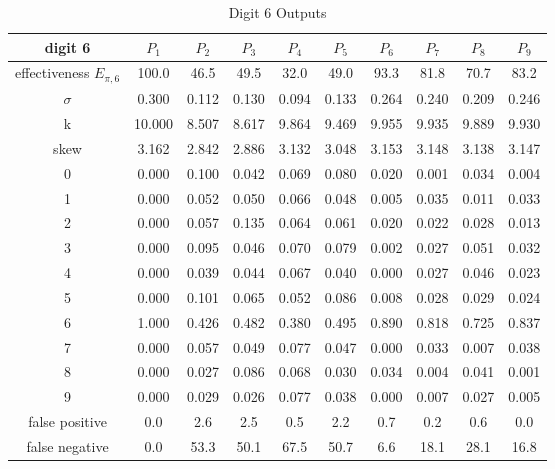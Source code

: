 \documentclass[conference]{IEEEtran}
\begin{document}
\begin{table}
\caption{Digit 6 Outputs}
\centering\begin{tabular}{ | c ||  c | c | c | c | c | c | c | c | c |}
 digit 6 & $P_1$ & $P_2$ & $P_3$ & $P_4$ & $P_5$ & $P_6$ & $P_7$ & $P_8$ & $P_9$ \\
\hline \hline
effectiveness $E_{\pi,6}$  & 100.0 & 46.5 & 49.5 & 32.0 & 49.0 & 93.3 & 81.8 & 70.7 & 83.2 \\
\hline
$\sigma$ & 0.300& 0.112& 0.130& 0.094& 0.133& 0.264& 0.240& 0.209& 0.246 \\
\hline
k & 10.000& 8.507& 8.617& 9.864& 9.469& 9.955& 9.935& 9.889& 9.930 \\
\hline
skew & 3.162& 2.842& 2.886& 3.132& 3.048& 3.153& 3.148& 3.138& 3.147 \\
\hline
0 & 0.000 & 0.100 & 0.042 & 0.069 & 0.080 & 0.020 & 0.001 & 0.034 & 0.004 \\
\hline
1 & 0.000 & 0.052 & 0.050 & 0.066 & 0.048 & 0.005 & 0.035 & 0.011 & 0.033 \\
\hline
2 & 0.000 & 0.057 & 0.135 & 0.064 & 0.061 & 0.020 & 0.022 & 0.028 & 0.013 \\
\hline
3 & 0.000 & 0.095 & 0.046 & 0.070 & 0.079 & 0.002 & 0.027 & 0.051 & 0.032 \\
\hline
4 & 0.000 & 0.039 & 0.044 & 0.067 & 0.040 & 0.000 & 0.027 & 0.046 & 0.023 \\
\hline
5 & 0.000 & 0.101 & 0.065 & 0.052 & 0.086 & 0.008 & 0.028 & 0.029 & 0.024 \\
\hline
6 & 1.000 & 0.426 & 0.482 & 0.380 & 0.495 & 0.890 & 0.818 & 0.725 & 0.837 \\
\hline
7 & 0.000 & 0.057 & 0.049 & 0.077 & 0.047 & 0.000 & 0.033 & 0.007 & 0.038 \\
\hline
8 & 0.000 & 0.027 & 0.086 & 0.068 & 0.030 & 0.034 & 0.004 & 0.041 & 0.001 \\
\hline
9 & 0.000 & 0.029 & 0.026 & 0.077 & 0.038 & 0.000 & 0.007 & 0.027 & 0.005 \\
\hline
false positive  & 0.0 & 2.6 & 2.5 & 0.5 & 2.2 & 0.7 & 0.2 & 0.6 & 0.0 \\
\hline
false negative  & 0.0 & 53.3 & 50.1 & 67.5 & 50.7 & 6.6 & 18.1 & 28.1 & 16.8 \\
\hline
\end{tabular}
\label{table:digit6out}
\end{table}


{}
\end{document}
